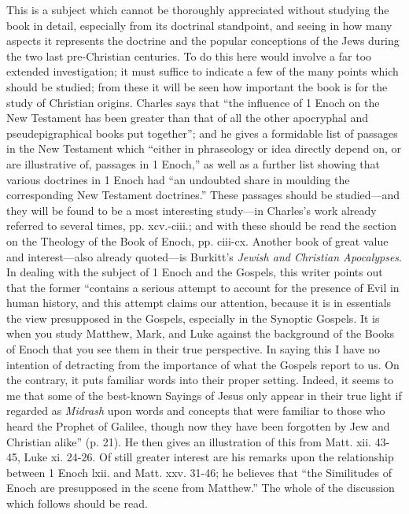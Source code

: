 This is a subject which cannot be thoroughly
appreciated without studying the book in detail,
especially from its doctrinal standpoint, and seeing
in how many aspects it represents the doctrine
and the popular conceptions of the Jews during the
two last pre-Christian centuries. To do this here
would involve a far too extended investigation; it
must suffice to indicate a few of the many points
which should be studied; from these it will be seen
how important the book is for the study of Christian
origins. Charles says that “the influence of 1 Enoch
on the New Testament has been greater than that
of all the other apocryphal and pseudepigraphical
books put together”; and he gives a formidable
list of passages in the New Testament which “either
in phraseology or idea directly depend on, or are
illustrative of, passages in 1 Enoch,” as well as a
further list showing that various doctrines in 1 Enoch
had “an undoubted share in moulding the corresponding
New Testament doctrines.” These passages
should be studied—and they will be found to be a
most interesting study—in Charles’s work already
referred to several times, pp. xcv.-ciii.; and with
these should be read the section on the Theology
of the Book of Enoch, pp. ciii-cx. Another book
of great value and interest—also already quoted—is
Burkitt’s \emph{Jewish and Christian Apocalypses}. In
dealing with the subject of 1 Enoch and the Gospels,
this writer points out that the former “contains a
serious attempt to account for the presence of Evil
in human history, and this attempt claims our attention,
because it is in essentials the view presupposed
in the Gospels, especially in the Synoptic Gospels.
It is when you study Matthew, Mark, and Luke
against the background of the Books of Enoch that
you see them in their true perspective. In saying
this I have no intention of detracting from the
importance of what the Gospels report to us. On the
contrary, it puts familiar words into their proper
setting. Indeed, it seems to me that some of the
best-known Sayings of Jesus only appear in their
true light if regarded as \emph{Midrash} upon words and
concepts that were familiar to those who heard the
Prophet of Galilee, though now they have been
forgotten by Jew and Christian alike” (p. 21). He
then gives an illustration of this from Matt. xii. 43-45,
Luke xi. 24-26. Of still greater interest are his
remarks upon the relationship between 1 Enoch lxii.
and Matt. xxv. 31-46; he believes that “the Similitudes
of Enoch are presupposed in the scene from
Matthew.” The whole of the discussion which
follows should be read.

